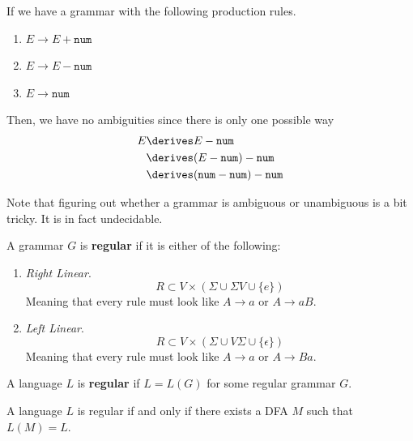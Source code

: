   \begin{example}
    If we have a grammar with the following production rules. 
    \begin{enumerate}
      \item $E \to E + \texttt{num}$
      \item $E \to E - \texttt{num}$ 
      \item $E \to \texttt{num}$
    \end{enumerate}
    Then, we have no ambiguities since there is only one possible way 
    \begin{align}
      E & \derives E - \texttt{num} \\ 
        & \derives (E - \texttt{num}) - \texttt{num} \\
        & \derives (\texttt{num} - \texttt{num}) - \texttt{num} 
    \end{align}
  \end{example}

  Note that figuring out whether a grammar is ambiguous or unambiguous is a bit tricky. It is in fact undecidable. 

  \begin{definition}[Regular]
    A grammar $G$ is \textbf{regular} if it is either of the following: 
    \begin{enumerate}
      \item \textit{Right Linear}. 
        \begin{equation}
          R \subset V \times (\Sigma \cup \Sigma V \cup \{e\}) 
        \end{equation}
        Meaning that every rule must look like $A \to a$ or $A \to a B$. 

      \item \textit{Left Linear}. 
        \begin{equation}
          R \subset V \times (\Sigma \cup V \Sigma \cup \{\epsilon\}) 
        \end{equation}
        Meaning that every rule must look like $A \to a$ or $A \to Ba$. 
    \end{enumerate}
    A language $L$ is \textbf{regular} if $L = L(G)$ for some regular grammar $G$. 
  \end{definition}

  \begin{theorem}
    A language $L$ is regular if and only if there exists a DFA $M$ such that $L(M) = L$. 
  \end{theorem}

